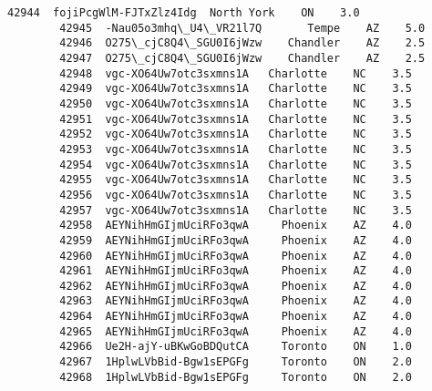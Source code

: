 \documentclass[11pt]{article}
\begin{document}
\begin{Verbatim}[commandchars=\\\{\}]
        42944  fojiPcgWlM-FJTxZlz4Idg  North York    ON    3.0   
        42945  -Nau05o3mhq\_U4\_VR21l7Q       Tempe    AZ    5.0   
        42946  O275\_cjC8Q4\_SGU0I6jWzw    Chandler    AZ    2.5   
        42947  O275\_cjC8Q4\_SGU0I6jWzw    Chandler    AZ    2.5   
        42948  vgc-XO64Uw7otc3sxmns1A   Charlotte    NC    3.5   
        42949  vgc-XO64Uw7otc3sxmns1A   Charlotte    NC    3.5   
        42950  vgc-XO64Uw7otc3sxmns1A   Charlotte    NC    3.5   
        42951  vgc-XO64Uw7otc3sxmns1A   Charlotte    NC    3.5   
        42952  vgc-XO64Uw7otc3sxmns1A   Charlotte    NC    3.5   
        42953  vgc-XO64Uw7otc3sxmns1A   Charlotte    NC    3.5   
        42954  vgc-XO64Uw7otc3sxmns1A   Charlotte    NC    3.5   
        42955  vgc-XO64Uw7otc3sxmns1A   Charlotte    NC    3.5   
        42956  vgc-XO64Uw7otc3sxmns1A   Charlotte    NC    3.5   
        42957  vgc-XO64Uw7otc3sxmns1A   Charlotte    NC    3.5   
        42958  AEYNihHmGIjmUciRFo3qwA     Phoenix    AZ    4.0   
        42959  AEYNihHmGIjmUciRFo3qwA     Phoenix    AZ    4.0   
        42960  AEYNihHmGIjmUciRFo3qwA     Phoenix    AZ    4.0   
        42961  AEYNihHmGIjmUciRFo3qwA     Phoenix    AZ    4.0   
        42962  AEYNihHmGIjmUciRFo3qwA     Phoenix    AZ    4.0   
        42963  AEYNihHmGIjmUciRFo3qwA     Phoenix    AZ    4.0   
        42964  AEYNihHmGIjmUciRFo3qwA     Phoenix    AZ    4.0   
        42965  AEYNihHmGIjmUciRFo3qwA     Phoenix    AZ    4.0   
        42966  Ue2H-ajY-uBKwGoBDQutCA     Toronto    ON    1.0   
        42967  1HplwLVbBid-Bgw1sEPGFg     Toronto    ON    2.0   
        42968  1HplwLVbBid-Bgw1sEPGFg     Toronto    ON    2.0   
        

\end{Verbatim}
\end{document}
